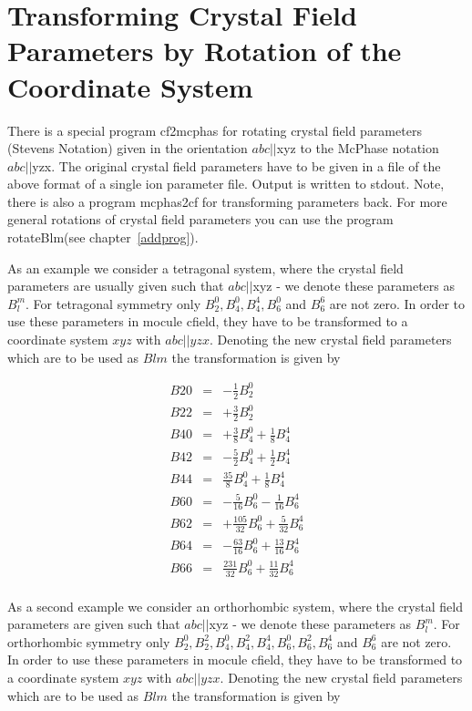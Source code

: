 \section{Transforming Crystal Field Parameters  by Rotation of the Coordinate %
System}\label{rotateBlm}

There is a special program {\prg cf2mcphas} for rotating crystal field parameters
(Stevens Notation) 
given in the orientation $abc||$xyz to the {\prg McPhase} notation $abc||$yzx. The 
original crystal field parameters have to be given in a file of the above format of a %
single
ion parameter file. Output is written to stdout. Note, there is also a program {\prg
mcphas2cf} for transforming parameters back. For more general rotations of 
crystal field parameters you can use the program {\prg rotateBlm}(see %
chapter~\ref{addprog}).

As an example we consider a tetragonal system, where the crystal field parameters
are usually given such that  $abc||$xyz - we denote these parameters as
 $B_l^m$. For tetragonal symmetry only $B_2^0, B_4^0, B_4^4, B_6^0$ and $B_6^6$ are
 not zero. In order to use these parameters in {\prg mocule cfield}, they 
 have to be transformed to a coordinate system $xyz$ with $abc||yzx$. Denoting the new
 crystal field parameters which are to be used as $Blm$ the transformation
 is given by 
 
\begin{eqnarray}
 B20&=&-\frac{1}{2} B_2^0  \nonumber \\  
 B22&=&+\frac{3}{2} B_2^0  \nonumber \\
 B40&=&+\frac{3}{8} B_4^0+\frac{1}{8} B_4^4     \nonumber \\
 B42&=&-\frac{5}{2} B_4^0+\frac{1}{2} B_4^4    \nonumber \\
 B44&=&\frac{35}{8} B_4^0+\frac{1}{8} B_4^4  \nonumber \\
 B60&=&-\frac{5}{16} B_6^0-\frac{1}{16} B_6^4  \nonumber \\
 B62&=&+\frac{105}{32} B_6^0+\frac{5}{32} B_6^4  \nonumber \\
 B64&=&-\frac{63}{16} B_6^0+\frac{13}{16} B_6^4  \nonumber \\
 B66&=&\frac{231}{32} B_6^0+\frac{11}{32} B_6^4  \nonumber \\
\end{eqnarray}

As a second example we consider an orthorhombic system, where the crystal field %
parameters
are given such that  $abc||$xyz - we denote these parameters as
 $B_l^m$. For orthorhombic symmetry only $B_2^0,B_2^2, B_4^0,B_4^2, B_4^4, B_6^0, B_6^2, %
B_6^4$ and $B_6^6$ are
 not zero. In order to use these parameters in {\prg mocule cfield}, they 
 have to be transformed to a coordinate system $xyz$ with $abc||yzx$. Denoting the new
 crystal field parameters which are to be used as $Blm$ the transformation
 is given by 
 
